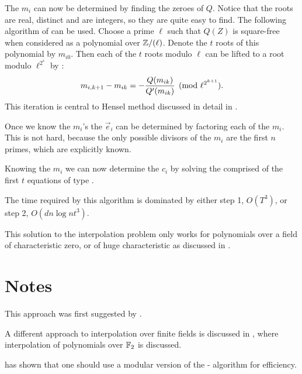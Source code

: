 The $m_i$ can now be determined by finding the zeroes of $Q$.  Notice
that the roots are real, distinct and are integers, so they are quite
easy to find.  The following algorithm of {\Loos} \cite{Loos83} can be
used.  Choose a prime $\ell$ such that $Q(Z)$ is square-free when
considered as a polynomial over $\mathbb{Z}/(\ell)$.  Denote the $t$ roots of
this polynomial by $m_{i0}$.  Then each of the $t$ roots modulo $\ell$
can be lifted to a root modulo $\ell^{2^s}$ by :
\[
m_{i,k+1} - m_{ik} = - {Q(m_{ik}) \over Q'(m_{ik})} \pmod{\ell^{2^{k+1}}}.
\]
This iteration is central to Hensel method discussed in detail in
.

Once we know the $m_i$'s the $\vec e_i$ can be determined by factoring each of
the $m_i$.  This is not hard, because the only possible divisors of the $m_i$
are the first $n$ primes, which are explicitly known.

Knowing the $m_i$ we can now determine the $c_i$ by solving the
 comprised of the first $t$ equations of type
.

The time required by this algorithm is dominated by either step 1,
$O(T^3)$, or step 2, $O(dn \log n t^3)$.

\medskip
This solution to the interpolation problem only works for polynomials
over a field of characteristic zero, or of huge characteristic as
discussed in .

\section*{Notes}

\small

 This approach was first suggested by
{\BrownWS} \cite{Brown:Euclid}.

  A different  approach to
interpolation over finite fields is discussed in \cite{Roth91}, where
interpolation of polynomials over $\mathbb{F}_2$ is discussed.

  {\Kaltofen} \cite{Kaltofen90c} has shown
that one should use a modular version of the {\BenOr}-{\Tiwari}
algorithm for efficiency.

\normalsize
